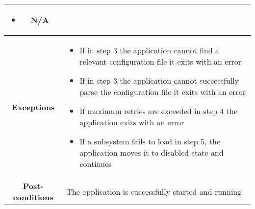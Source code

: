 \begin{longtable}{ |c|p{11.8cm}| }
{\begin{itemize}
                        \item N/A
                    \end{itemize}
                }\\ \hline
                \cellcolor[gray]{0.9} \textbf{Exceptions} &
                    \begin{itemize}
                        \item If in step 3 the application cannot find a relevant configuration file it exits with an error
                        \item If in step 3 the application cannot successfully parse the configuration file it exits with an error
                        \item If maximum retries are exceeded in step 4 the application exits with an error
                        \item If a subsystem fails to load in step 5, the application moves it to disabled state and continues
                    \end{itemize}\\ \hline
                \cellcolor[gray]{0.9} \textbf{Post-conditions} & The application is successfully started and running\\ \hline
            \end{longtable}

